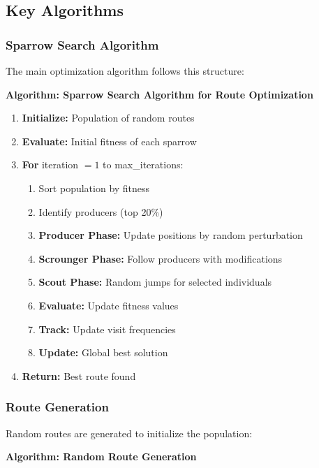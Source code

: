 \documentclass[conference]{IEEEtran}
\begin{document}
\subsection{Key Algorithms}

\subsubsection{Sparrow Search Algorithm}
The main optimization algorithm follows this structure:

\noindent\textbf{Algorithm: Sparrow Search Algorithm for Route Optimization}

\begin{enumerate}
\item \textbf{Initialize:} Population of random routes
\item \textbf{Evaluate:} Initial fitness of each sparrow
\item \textbf{For} iteration $=1$ to max\_iterations:
    \begin{enumerate}
    \item Sort population by fitness
    \item Identify producers (top 20\%)
    \item \textbf{Producer Phase:} Update positions by random perturbation
    \item \textbf{Scrounger Phase:} Follow producers with modifications
    \item \textbf{Scout Phase:} Random jumps for selected individuals
    \item \textbf{Evaluate:} Update fitness values
    \item \textbf{Track:} Update visit frequencies
    \item \textbf{Update:} Global best solution
    \end{enumerate}
\item \textbf{Return:} Best route found
\end{enumerate}

\subsubsection{Route Generation}
Random routes are generated to initialize the population:

\noindent\textbf{Algorithm: Random Route Generation}
\end{document}
